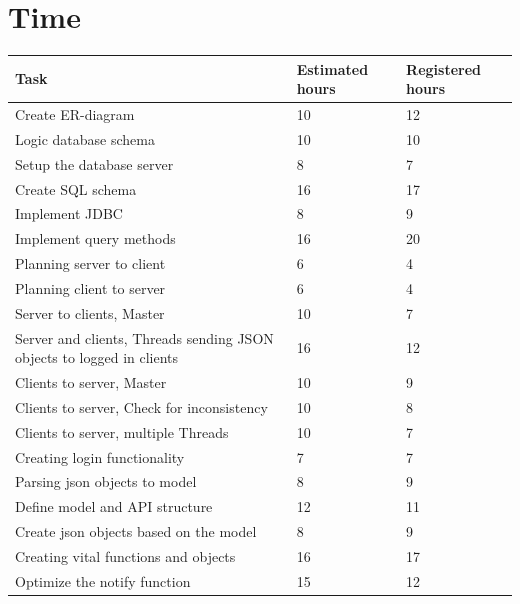 \documentclass[a4paper, 10pt]{article}
\begin{document}

\thispagestyle{empty}

\setcounter{page}{0}
\newpage
\tableofcontents

\newpage
{}
\setcounter{page}{1}

\section{Time}


\begin{tabularx}{\textwidth}{ |X|X|X| }
\hline
\rowcolor{Gray}
Task & Estimated hours & Registered hours \\ \hline
Create ER-diagram & 10 & 12 \\ \hline
Logic database schema & 10 & 10 \\ \hline
Setup the database server & 8 & 7 \\ \hline
Create SQL schema & 16 & 17 \\ \hline
Implement JDBC & 8 & 9 \\ \hline
Implement query methods & 16 & 20 \\ \hline
\hline
Planning server to client & 6 & 4 \\ \hline
Planning client to server & 6 & 4 \\ \hline
Server to clients, Master & 10 & 7 \\ \hline
Server and clients, Threads sending JSON objects to logged in clients & 16 & 12 \\ \hline
Clients to server, Master & 10 & 9\\ \hline
Clients to server, Check for inconsistency & 10 & 8\\ \hline
Clients to server, multiple Threads & 10 & 7\\ \hline
\hline
Creating login functionality & 7 & 7 \\ \hline
Parsing json objects to model & 8 & 9 \\ \hline
Define model and API structure  & 12 & 11\\ \hline
Create json objects based on the model & 8 & 9 \\ \hline
Creating vital functions and objects & 16 & 17 \\ \hline
Optimize the notify function & 15 & 12 \\ \hline    
\end{tabularx}
\end{document}
